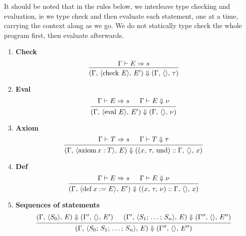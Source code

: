 \documentclass{article}
\begin{document}
It should be noted that in the rules below, we interleave type checking and 
evaluation, ie we type check and then evaluate each statement, one at a time,
carrying the context along as we go.
We do not statically type check the whole program first, then evaluate
afterwards.

\begin{enumerate}
\item \textbf{Check} \\
  \[
    \begin{prooftree}
      \hypo{\Gamma \vdash E \Rightarrow s}
      \infer1{(\Gamma, \, \langle \checkk \, E \rangle, \, E') \Downarrow
        (\Gamma, \, \langle \rangle, \, \tau)}
    \end{prooftree}
  \]

\item \textbf{Eval} \\
  \[
    \begin{prooftree}
      \hypo{\Gamma \vdash E \Rightarrow s}
      \hypo{\Gamma \vdash E \Downarrow \nu}
      \infer2{(\Gamma, \, \langle \evall \, E \rangle, \, E') \Downarrow
        (\Gamma, \, \langle \rangle, \, \nu)}
    \end{prooftree}
  \]

\item \textbf{Axiom} \\
  \[
    \begin{prooftree}
      \hypo{\Gamma \vdash T \Rightarrow s}
      \hypo{\Gamma \vdash T \Downarrow \tau}
      \infer2{(\Gamma, \, \langle \axiom x : T \rangle, \, E) \Downarrow
        ((x, \, \tau, \, \text{und}) :: \Gamma, \, \langle \rangle, \, x)}
    \end{prooftree}
  \]

\item \textbf{Def} \\
  \[
    \begin{prooftree}
      \hypo{\Gamma \vdash E \Rightarrow s}
      \hypo{\Gamma \vdash E \Downarrow \nu}
      \infer2{(\Gamma, \, \langle \deff x := E \rangle, \, E') \Downarrow
        ((x, \, \tau, \, \nu) :: \Gamma, \, \langle \rangle, \, x)}
    \end{prooftree}
  \]

\item \textbf{Sequences of statements} \\
  \[
    \begin{prooftree}
      \hypo{(\Gamma, \, \langle S_0 \rangle, \, E) \Downarrow
        (\Gamma', \, \langle \rangle, \, E') }
      \hypo{(\Gamma', \, \langle S_1; \, \dots; \, S_n \rangle, \, E) \Downarrow
        (\Gamma'', \, \langle \rangle, \, E'') }
      \infer2{(\Gamma, \, \langle S_0; \, S_1; \, \dots; \, S_n \rangle, \, E) \Downarrow
        (\Gamma'', \, \langle \rangle, \, E'') }
    \end{prooftree}
  \]

\end{enumerate}
\end{document}
